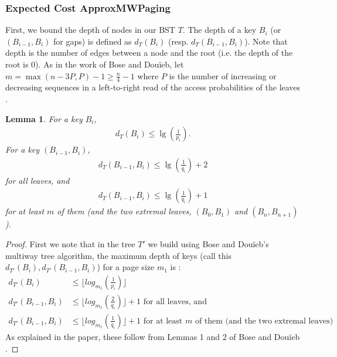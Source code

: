 \documentclass[]{beamer}
\theoremstyle{plain}
\newtheorem{lem}[thm]{Lemma}
\begin{document}
\begin{frame} \frametitle{Expected Cost ApproxMWPaging} \label{45}

First, we bound the depth of nodes in our BST $T$. The depth of a key $B_i$ (or $(B_{i-1}, B_i)$ for gaps) is defined as $d_T(B_i)$ (resp. $d_T(B_{i-1},B_i)$). Note that depth is the number of edges between a node and the root (i.e. the depth of the root is $0$). As in the work of Bose and Dou\"{i}eb, let $m=\max({n-3P,P})-1 \geq \frac{n}{4} - 1$ where $P$ is the number of increasing or decreasing sequences in a left-to-right read of the access probabilities of the leaves \cite{bose2009efficient}.

\begin{lem} \label{451}
For a key $B_i$,
\begin{align*} 
d_T(B_i) \leq \lg(\frac{1}{p_i}).
\end{align*}
For a key $(B_{i-1},B_i)$,
\begin{align*} 
d_T(B_{i-1},B_i) \leq \lg(\frac{1}{q_i}) + 2
\end{align*}
for all leaves, and
\begin{align*} 
d_T(B_{i-1},B_i) \leq \lg(\frac{1}{q_i}) + 1
\end{align*}
for at least $m$ of them (and the two extremal leaves, $(B_0, B_1)$ and $(B_n, B_{n+1})$). 
  
\end{lem}

\begin{proof}
First we note that in the tree $T'$ we build using Bose and Dou\"{i}eb's multiway tree algorithm, the maximum depth of keys (call this $d_{T'}(B_i), d_{T'}(B_{i-1},B_i)$) for a page size $m_1$ is \cite{bose2009efficient}:
\begin{align*} d_{T'}(B_i) &\leq \lfloor log_{m_1}(\frac{1}{p_i}) \rfloor \\
d_{T'}(B_{i-1},B_i) &\leq \lfloor log_{m_1}(\frac{2}{q_i}) \rfloor + 1 \text{ for all leaves, and}\\
d_{T'}(B_{i-1},B_i) &\leq \lfloor log_{m_1}(\frac{1}{q_i}) \rfloor + 1 \text{ for at least $m$ of them (and the two extremal leaves)}
 \end{align*}
As explained in the paper, these follow from Lemmas 1 and 2 of Bose and Dou\"{i}eb \cite{bose2009efficient}.


\end{proof}
\end{frame}
\end{document}
